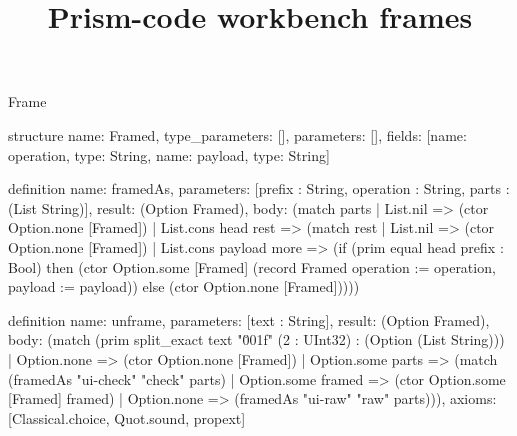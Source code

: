 \begin{lexlean}{Frame}
\title{Prism-code workbench frames}
\begin{semanticmodule}
structure{
  name: Framed,
  type_parameters: [],
  parameters: [],
  fields: [{name: operation, type: String}, {name: payload, type: String}]
}

definition{
  name: framedAs,
  parameters: [prefix : String, operation : String, parts : (List String)],
  result: (Option Framed),
  body: (match parts
    | List.nil => (ctor Option.none [Framed])
    | List.cons head rest => (match rest
      | List.nil => (ctor Option.none [Framed])
      | List.cons payload more => (if (prim equal head prefix : Bool) then (ctor Option.some [Framed] (record Framed {operation := operation, payload := payload})) else (ctor Option.none [Framed]))))
}

definition{
  name: unframe,
  parameters: [text : String],
  result: (Option Framed),
  body: (match (prim split_exact text "\u001f" (2 : UInt32) : (Option (List String)))
    | Option.none => (ctor Option.none [Framed])
    | Option.some parts => (match (framedAs "ui-check" "check" parts)
      | Option.some framed => (ctor Option.some [Framed] framed)
      | Option.none => (framedAs "ui-raw" "raw" parts))),
  axioms: [Classical.choice, Quot.sound, propext]
}


\end{semanticmodule}
\end{lexlean}

